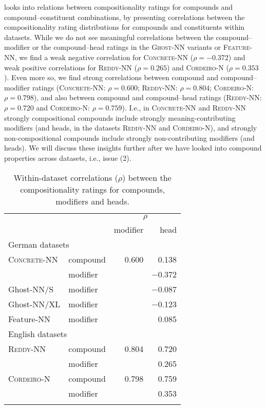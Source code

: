 \documentclass[output=paper,colorlinks,citecolor=brown]{langscibook}
\begin{document}
 looks into relations between compositionality ratings for compounds and compound--constituent combinations, by presenting correlations between the compositionality rating distributions for compounds and constituents within datasets. While we do not see meaningful correlations between the compound--modifier or the compound--head ratings in the \textsc{Ghost-NN} variants or \textsc{Feature-NN}, we find a weak negative correlation for \textsc{Concrete-NN} ($\rho=-0.372$) and weak positive correlations for \textsc{Reddy-NN} ($\rho=0.265$) and \textsc{Cor\-dei\-ro-N} ($\rho=0.353$). Even more so, we find strong correlations between compound and com\-pound--mod\-i\-fi\-er ratings (\textsc{Concrete-NN}: $\rho=0.600$; \textsc{Reddy-NN}: $\rho=0.804$; \textsc{Cor\-dei\-ro-N}: $\rho=0.798$), and also between compound and compound--head ratings (\textsc{Reddy-NN}: $\rho=0.720$ and \textsc{Cor\-dei\-ro-N}: $\rho=0.759$). I.e., in \textsc{Concrete-NN} and \textsc{Reddy-NN} strongly compositional compounds include strongly meaning-contributing modifiers (and heads, in the datasets \textsc{Reddy-NN} and \textsc{Cor\-dei\-ro-N}), and strongly non-compositional compounds include strongly non-contributing modifiers (and heads). We will discuss these insights further after we have looked into compound properties across datasets, i.e., issue (2).


\begin{table}
\caption{Within-dataset correlations ($\rho$) between the compositionality ratings for compounds, modifiers and heads.}
\label{tab:corr-comp-ratings}
\begin{tabular}{llrr}
\lsptoprule
  & & \multicolumn{2}{c}{$\rho$} \\\cmidrule(lr){3-4}
  & & modifier & head \\\midrule
  \multicolumn{4}{l}{German datasets} \\    
    {\textsc{Concrete-NN}} & compound & \cellcolor{lred}0.600 & 0.138 \\
                           & modifier  & & \cellcolor{beaublue} −0.372 \\
    {Ghost-NN/S} & modifier & &  −0.087 \\
    {Ghost-NN/XL} & modifier & &  −0.123 \\
    {Feature-NN} & modifier  & &  0.085 \\
    \midrule    
    \multicolumn{4}{l}{English datasets} \\
    {\textsc{Reddy-NN}} & compound & \cellcolor{lred}0.804 & \cellcolor{lred}0.720 \\
                        & modifier  & & \cellcolor{beaublue}0.265 \\
    {\textsc{Cordeiro-N}} & compound & \cellcolor{lred}0.798 & \cellcolor{lred}0.759 \\
    & modifier  & & \cellcolor{beaublue}0.353 \\
  \lspbottomrule
 \end{tabular}
\end{table}
\end{document}
